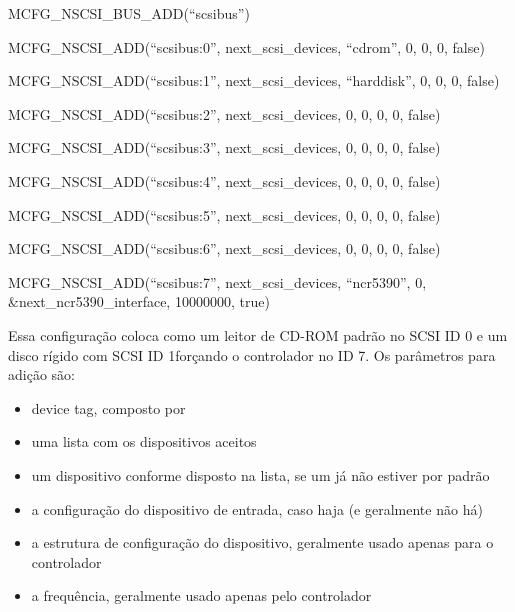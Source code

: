 \documentclass[letterpaper,10pt,brazil]{sphinxmanual}
\begin{document}
\begin{DUlineblock}{0em}
\item[] 
\item[]
\begin{DUlineblock}{\DUlineblockindent}
\item[] MCFG\_NSCSI\_BUS\_ADD(``scsibus'')
\item[] MCFG\_NSCSI\_ADD(``scsibus:0'', next\_scsi\_devices, ``cdrom'', 0, 0, 0, false)
\item[] MCFG\_NSCSI\_ADD(``scsibus:1'', next\_scsi\_devices, ``harddisk'', 0, 0, 0, false)
\item[] MCFG\_NSCSI\_ADD(``scsibus:2'', next\_scsi\_devices, 0, 0, 0, 0, false)
\item[] MCFG\_NSCSI\_ADD(``scsibus:3'', next\_scsi\_devices, 0, 0, 0, 0, false)
\item[] MCFG\_NSCSI\_ADD(``scsibus:4'', next\_scsi\_devices, 0, 0, 0, 0, false)
\item[] MCFG\_NSCSI\_ADD(``scsibus:5'', next\_scsi\_devices, 0, 0, 0, 0, false)
\item[] MCFG\_NSCSI\_ADD(``scsibus:6'', next\_scsi\_devices, 0, 0, 0, 0, false)
\item[] MCFG\_NSCSI\_ADD(``scsibus:7'', next\_scsi\_devices, ``ncr5390'', 0, \&next\_ncr5390\_interface, 10000000, true)
\end{DUlineblock}
\end{DUlineblock}

Essa configuração coloca como um leitor de CD-ROM padrão no SCSI ID 0 e
um disco rígido com SCSI ID 1forçando o controlador no ID 7.
Os parâmetros para adição são:
\begin{itemize}
\item {} 
device tag, composto por 

\item {} 
uma lista com os dispositivos aceitos

\item {} 
um dispositivo conforme disposto na lista, se um já não estiver por padrão

\item {} 
a configuração do dispositivo de entrada, caso haja (e geralmente não há)

\item {} 
a estrutura de configuração do dispositivo, geralmente usado apenas para o controlador

\item {} 
a frequência, geralmente usado apenas pelo controlador

\end{itemize}
\end{document}
